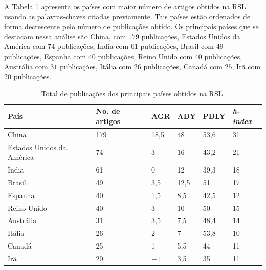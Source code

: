 A Tabela \ref{tb:pais} apresenta os países com maior número de artigos obtidos na RSL usando as palavras-chaves citadas previamente. Tais países estão ordenados de forma decrescente pelo número de publicações obtido. Os principais países que se destacam nessa análise são China, com $179$ publicações, Estados Unidos da América com $74$ publicações, Índia com $61$ publicações, Brasil com $49$ publicações, Espanha com $40$ publicações, Reino Unido com $40$ publicações, Austrália com $31$ publicações, Itália com $26$ publicações, Canadá com $25$, Irã com $20$ publicações.

\begin{table}[!htb]
	\centering
	\caption{Total de publicações dos principais países obtidos na RSL.}\label{tb:pais}
	\begin{tabular}{llllll}
		\toprule
		País & No. de artigos & AGR & ADY & PDLY & \textit{h-index} \\
		\midrule
		China & 179 & 18,5 & 48 & 53,6 & 31 \\
		Estados Unidos da América & 74 & 3 & 16 & 43,2 & 21 \\
		Índia & 61 & 0 & 12 & 39,3 & 18 \\
		Brasil & 49 & 3,5 & 12,5 & 51 & 17 \\
		Espanha & 40 & 1,5 & 8,5 & 42,5 & 12 \\
		Reino Unido & 40 & 3 & 10 & 50 & 15 \\
		Austrália & 31 & 3,5 & 7,5 & 48,4 & 14 \\
		Itália & 26 & 2 & 7 & 53,8 & 10 \\
		Canadá & 25 & 1 & 5,5 & 44 & 11 \\
		Irã & 20 & $-1$ & 3,5 & 35 & 11 \\
		\bottomrule
	\end{tabular}
\end{table}



